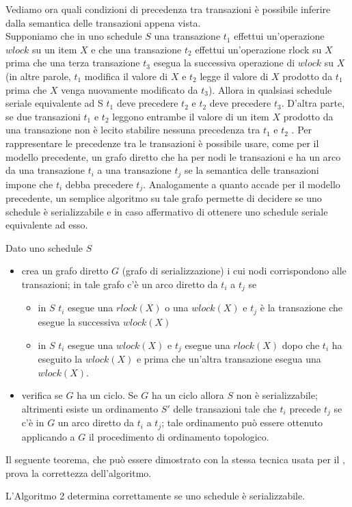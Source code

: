 Vediamo ora quali condizioni di precedenza tra transazioni è possibile inferire dalla semantica delle
transazioni appena vista.\\
Supponiamo che in uno schedule $S$ una transazione $t_1$ effettui un’operazione $wlock$ su un item $X$ e
che una transazione $t_2$ effettui un’operazione rlock su $X$ prima che una terza transazione $t_3$ esegua
la successiva operazione di $wlock$ su $X$ (in altre parole, $t_1$ modifica il valore di $X$ e $t_2$ legge il
valore di $X$ prodotto da $t_1$ prima che $X$ venga nuovamente modificato da $t_3$). Allora in qualsiasi
schedule seriale equivalente ad S $t_1$ deve precedere $t_2$ e $t_2$ deve precedere $t_3$. D’altra parte, se due
transazioni $t_1$ e $t_2$ leggono entrambe il valore di un item $X$ prodotto da una transazione non è lecito
stabilire nessuna precedenza tra $t_1$ e $t_2$ .
Per rappresentare le precedenze tra le transazioni è possibile usare, come per il modello precedente,
un grafo diretto che ha per nodi le transazioni e ha un arco da una transazione $t_i$ a una transazione
$t_j$ se la semantica delle transazioni impone che $t_i$ debba precedere $t_j$. Analogamente a quanto
accade per il modello precedente, un semplice algoritmo su tale grafo permette di decidere se uno
schedule è serializzabile e in caso affermativo di ottenere uno schedule seriale equivalente ad esso.

\begin{alg}
Dato uno schedule $S$
\begin{itemize}
 \item crea un grafo diretto $G$ (grafo di serializzazione) i cui nodi corrispondono alle transazioni; in
tale grafo c’è un arco diretto da $t_i$ a $t_j$ se
 \begin{itemize}
  \item in $S$ $t_i$ esegue una $rlock(X)$ o una $wlock(X)$ e $t_j$ è la transazione che esegue la successiva
   $wlock(X)$
  \item in $S$ $t_i$ esegue una $wlock(X)$ e $t_j$ esegue una $rlock(X)$ dopo che $t_i$ ha eseguito la $wlock(X)$ e
prima che un’altra transazione esegua una $wlock(X)$.
 \end{itemize}
\item verifica se $G$ ha un ciclo. Se $G$ ha un ciclo allora $S$ non è serializzabile; altrimenti esiste un
ordinamento $S'$ delle transazioni tale che $t_i$ precede $t_j$ se c’è in $G$ un arco diretto da $t_i$ a $t_j$; tale
ordinamento può essere ottenuto applicando a $G$ il procedimento di ordinamento topologico.
\end{itemize}
\end{alg}

Il seguente teorema, che può essere dimostrato con la stessa tecnica usata per il ,
prova la correttezza dell’algoritmo.
\begin{theo}
L’Algoritmo 2 determina correttamente se uno schedule è serializzabile. 
\end{theo}

